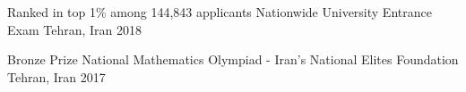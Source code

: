 



\begin{cvhonors}

  \cvhonor
    {Ranked in top 1\% among 144,843 applicants} %
    {Nationwide University Entrance Exam} %
    {Tehran, Iran} %
    {2018} %

  \cvhonor
    {Bronze Prize} %
    {National Mathematics Olympiad - Iran's National Elites Foundation} %
    {Tehran, Iran} %
    {2017} %

\end{cvhonors}
